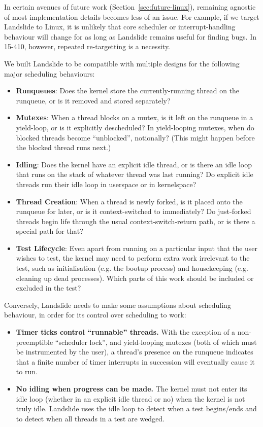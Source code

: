 In certain avenues of future work (Section~\ref{sec:future-linux}), remaining agnostic of most implementation details becomes less of an issue. For example, if we target Landslide to Linux, it is unlikely that core scheduler or interrupt-handling behaviour will change for as long as Landslide remains useful for finding bugs. In 15-410, however, repeated re-targetting is a necessity.

We built Landslide to be compatible with multiple designs for the following major scheduling behaviours:

\begin{itemize}
	\item {\bf Runqueues}: Does the kernel store the currently-running thread on the runqueue, or is it removed and stored separately?
	\item {\bf Mutexes}: When a thread blocks on a mutex, is it left on the runqueue in a yield-loop, or is it explicitly descheduled? In yield-looping mutexes, when do blocked threads become ``unblocked'', notionally? (This might happen before the blocked thread runs next.)
	\item {\bf Idling}: Does the kernel have an explicit idle thread, or is there an idle loop that runs on the stack of whatever thread was last running? Do explicit idle threads run their idle loop in userspace or in kernelspace?
	\item {\bf Thread Creation}: When a thread is newly forked, is it placed onto the runqueue for later, or is it context-switched to immediately? Do just-forked threads begin life through the usual context-switch-return path, or is there a special path for that?
	\item {\bf Test Lifecycle}: Even apart from running on a particular input that the user wishes to test, the kernel may need to perform extra work irrelevant to the test, such as initialisation (e.g. the bootup process) and housekeeping (e.g. cleaning up dead processes). Which parts of this work should be included or excluded in the test?
\end{itemize}

Conversely, Landslide needs to make some assumptions about scheduling behaviour, in order for its control over scheduling to work:

\begin{itemize}
	\item {\bf Timer ticks control ``runnable'' threads.} With the exception of a non-preemptible ``scheduler lock'', and yield-looping mutexes (both of which must be instrumented by the user), a thread's presence on the runqueue indicates that a finite number of timer interrupts in succession will eventually cause it to run.
	\item {\bf No idling when progress can be made.} The kernel must not enter its idle loop (whether in an explicit idle thread or no) when the kernel is not truly idle. Landslide uses the idle loop to detect when a test begins/ends and to detect when all threads in a test are wedged.
\end{itemize}
